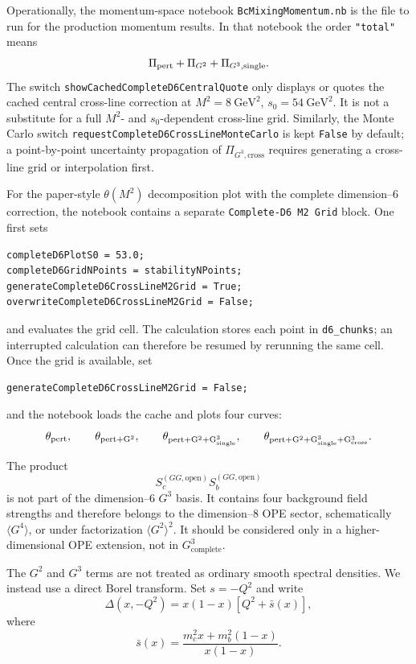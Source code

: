 \documentclass[11pt]{article}
\begin{document}
Operationally, the momentum-space notebook \texttt{BcMixingMomentum.nb} is the
file to run for the production momentum results.  In that notebook the order
\texttt{"total"} means
\[
  \Pi_{\rm pert}+\Pi_{G^2}+\Pi_{G^3,\mathrm{single}} .
\]
The switch \texttt{showCachedCompleteD6CentralQuote} only displays or quotes
the cached central cross-line correction at
\(M^2=8~\mathrm{GeV}^2\), \(s_0=54~\mathrm{GeV}^2\).  It is not a substitute
for a full \(M^2\)- and \(s_0\)-dependent cross-line grid.  Similarly, the
Monte Carlo switch \texttt{requestCompleteD6CrossLineMonteCarlo} is kept
\texttt{False} by default; a point-by-point uncertainty propagation of
\(\Pi_{G^3,\mathrm{cross}}\) requires generating a cross-line grid or
interpolation first.

For the paper-style \(\theta(M^2)\) decomposition plot with the complete
dimension--6 correction, the notebook contains a separate
\texttt{Complete-D6 M2 Grid} block.  One first sets
\begin{verbatim}
completeD6PlotS0 = 53.0;
completeD6GridNPoints = stabilityNPoints;
generateCompleteD6CrossLineM2Grid = True;
overwriteCompleteD6CrossLineM2Grid = False;
\end{verbatim}
and evaluates the grid cell.  The calculation stores each point in
\texttt{d6\_chunks}; an interrupted calculation can therefore be resumed by
rerunning the same cell.  Once the grid is available, set
\begin{verbatim}
generateCompleteD6CrossLineM2Grid = False;
\end{verbatim}
and the notebook loads the cache and plots four curves:
\[
  \theta_{\rm pert},\qquad
  \theta_{\rm pert+G^2},\qquad
  \theta_{\rm pert+G^2+G^3_{\rm single}},\qquad
  \theta_{\rm pert+G^2+G^3_{\rm single}+G^3_{\rm cross}} .
\]

The product
\[
  S_c^{(GG,\mathrm{open})}S_b^{(GG,\mathrm{open})}
\]
is not part of the dimension--6 \(G^3\) basis.  It contains four background
field strengths and therefore belongs to the dimension--8 OPE sector,
schematically \(\langle G^4\rangle\), or under factorization
\(\langle G^2\rangle^2\).  It should be considered only in a higher-dimensional
OPE extension, not in \(G^3_{\mathrm{complete}}\).

The $G^2$ and $G^3$ terms are not treated as ordinary smooth spectral
densities.  We instead use a direct Borel transform.  Set $s=-Q^2$ and write
\begin{equation}
  \Delta(x,-Q^2)
  =
  x(1-x)
  \left[Q^2+\bar s(x)\right],
\end{equation}
where
\begin{equation}
  \bar s(x)
  =
  \frac{m_c^2x+m_b^2(1-x)}{x(1-x)}.
\end{equation}
\end{document}
